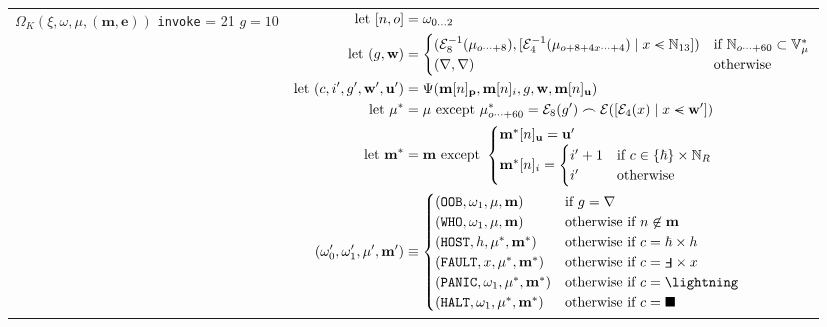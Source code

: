 \begin{longtable}{p{3.5cm} p{12.5cm}}
  \cmidrule(lr){1-1}\cmidrule(lr){2-2}
  \makecell*[l]{
  $\Omega_K(\xi, \omega, \mu, (\mathbf{m}, \mathbf{e}))$ \\
  \texttt{invoke} = 21 \\
  $g = 10$} &
  $\begin{aligned}
    \using [n, o] &= \omega_{0 \dots 2} \\
    \using (g, \mathbf{w}) &= \begin{cases}
      (\de_8(\mem_{o\dots+8}), [\de_4(\mem_{o+8+4x\dots+4}) \mid x \orderedin \N_{13}]) &\when \N_{o \dots+ 60} \subset \mathbb{V}^*_{\mem} \\
      (\error, \error) &\otherwise
    \end{cases} \\
    \using (c, i', g', \mathbf{w}', \mathbf{u}') &= \Psi(\mathbf{m}[n]_\mathbf{p}, \mathbf{m}[n]_i, g, \mathbf{w}, \mathbf{m}[n]_\mathbf{u})\\
    \using \mem^* &= \mem \exc \mem^*_{o\dots+60} = \se_8(g') \concat \se([\se_4(x) \mid x \orderedin \mathbf{w}'])\\
    \using \mathbf{m}^* &= \mathbf{m} \exc \begin{cases}
      \mathbf{m}^*[n]_\mathbf{u} = \mathbf{u}'\\
      \mathbf{m}^*[n]_i = \begin{cases}
        i' + 1 &\when c \in \{ \host \} \times \N_R\\
        i' &\otherwise
      \end{cases}
    \end{cases}\\
    (\omega'_0, \omega'_1, \mem', \mathbf{m}') &\equiv \begin{cases}
      (\mathtt{OOB}, \omega_1, \mem, \mathbf{m}) &\when g = \error \\
      (\mathtt{WHO}, \omega_1, \mem, \mathbf{m}) &\otherwhen n \not\in \mathbf{m} \\
      (\mathtt{HOST}, h, \mem^*, \mathbf{m}^*) &\otherwhen c = \host \times h \\
      (\mathtt{FAULT}, x, \mem^*, \mathbf{m}^*) &\otherwhen c = \fault \times x \\
      (\mathtt{PANIC}, \omega_1, \mem^*, \mathbf{m}^*) &\otherwhen c = \panic \\
      (\mathtt{HALT}, \omega_1, \mem^*, \mathbf{m}^*) &\otherwhen c = \halt \\
    \end{cases} \\
  \end{aligned}$\\

\end{longtable}
